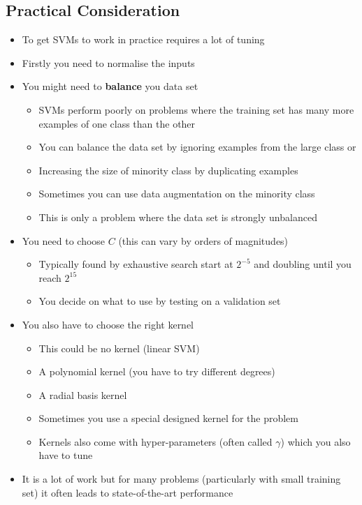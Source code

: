 \documentclass[11pt]{article}
\begin{document}
\subsection{Practical Consideration}
\label{sec:org352fd14}
\begin{itemize}
\item To get SVMs to work in practice requires a lot of tuning
\item Firstly you need to normalise the inputs
\item You might need to \textbf{balance} you data set
\begin{itemize}
\item SVMs perform poorly on problems where the training set has many
more examples of one class than the other
\item You can balance the data set by ignoring examples from the
large class or
\item Increasing the size of minority class by duplicating examples
\item Sometimes you can use data augmentation on the minority class
\item This is only a problem where the data set is strongly unbalanced
\end{itemize}
\item You need to choose \(C\) (this can vary by orders of magnitudes)
\begin{itemize}
\item Typically found by exhaustive search start at \(2^{-5}\) and
doubling until you reach \(2^{15}\)
\item You decide on what to use by testing on a validation set
\end{itemize}
\item You also have to choose the right kernel
\begin{itemize}
\item This could be no kernel (linear SVM)
\item A polynomial kernel (you have to try different degrees)
\item A radial basis kernel
\item Sometimes you use a special designed kernel for the problem
\item Kernels also come with hyper-parameters (often called \(\gamma\))
which you also have to tune
\end{itemize}
\item It is a lot of work but for many problems (particularly with
small training set) it often leads to state-of-the-art performance

\end{itemize}
\end{document}
